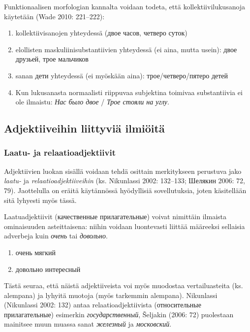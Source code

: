 \documentclass[]{scrartcl}
\providecommand{\tightlist}{%
  \setlength{\itemsep}{0pt}\setlength{\parskip}{0pt}}
\begin{document}
Funktionaalisen morfologian kannalta voidaan todeta, että
kollektiivilukusanoja käytetään (Wade 2010: 221--222):

\begin{enumerate}
\def\labelenumi{\arabic{enumi})}
\tightlist
\item
  kollektiivisanojen yhteydessä (двое часов, четверо суток)
\item
  elollisten maskuliinisubstantiivien yhteydessä (ei aina, mutta usein):
  двое друзьей, трое мальчиков
\item
  sanan дети yhteydessä (ei myöskään aina): трое/четверо/пятеро детей
\item
  Kun lukusanasta normaalisti riippuvaa subjektina toimivaa
  substantiivia ei ole ilmaistu: \emph{Нас было двое} / \emph{Трое
  стояли на углу}.
\end{enumerate}

\subsection{Adjektiiveihin liittyviä
ilmiöitä}\label{adjektiiveihin-liittyviuxe4-ilmiuxf6ituxe4}

\subsubsection{Laatu- ja
relaatioadjektiivit}\label{laatu--ja-relaatioadjektiivit}

Adjektiivien luokan sisällä voidaan tehdä osittain merkitykseen
perustuva jako \emph{laatu-} ja \emph{relaatioadjektiiveihin} (ks.
Nikunlassi 2002: 132--133; Шелякин 2006: 72, 79). Jaottelulla on eräitä
käytännössä hyödyllisiä sovellutuksia, joten käsitellään sitä lyhyesti
myös tässä.

Laatuadjektiivit (качественные прилагательные) voivat nimittäin ilmaista
ominaisuuden asteittaisena: niihin voidaan luontevasti liittää määreeksi
sellaisia adverbeja kuin \emph{очень} tai \emph{довольно}.

\begin{enumerate}
\def\labelenumi{(\arabic{enumi})}
\setcounter{enumi}{11}
\tightlist
\item
  очень мягкий
\item
  довольно интересный
\end{enumerate}

Tästä seuraa, että näistä adjektiiveista voi myös muodostaa
vertailuasteita (ks. alempana) ja lyhyitä muotoja (myös tarkemmin
alempana). Nikunlassi (Nikunlassi 2002: 132) antaa relaatioadjektiivista
(относительные прилагательные) esimerkin \emph{государственный},
Šeljakin (2006: 72) puolestaan mainitsee muun muassa sanat
\emph{железный} ja \emph{московский}.
\end{document}
